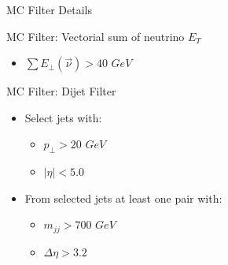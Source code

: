 \documentclass[8pt]{beamer}
\begin{document}
\begin{frame}{MC Filter Details}
 
\begin{block}{MC Filter: Vectorial sum of neutrino $E_T$}

  \begin{itemize}
     \item $\sum E_\perp(\vec{\nu}) > 40$ $GeV$
  \end{itemize}

\end{block}

\begin{block}{MC Filter: Dijet Filter}

  \begin{itemize}
    \item Select jets with:
    \begin{itemize}
      \item $p_\perp>20$ $GeV$
      \item $|\eta|<5.0$
    \end{itemize}
    \item From selected jets at least one pair with:
    \begin{itemize}
      \item $m_{jj}>700$ $GeV$
      \item $\Delta\eta>3.2$
    \end{itemize}    
  \end{itemize}

\end{block}

\end{frame}
\end{document}
